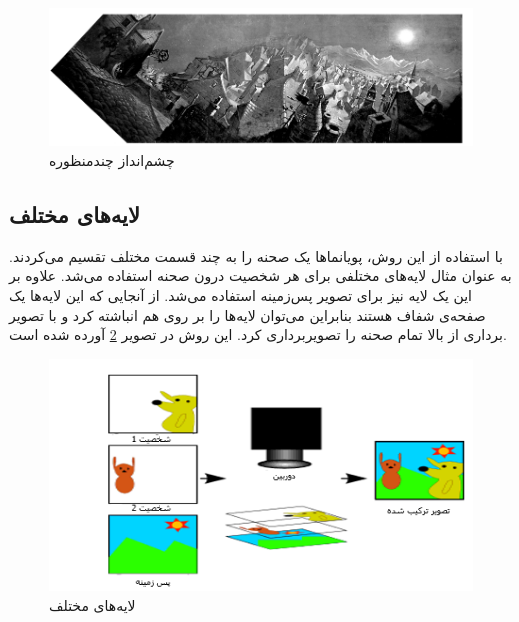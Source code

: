 \begin{figure}[ht]
	\centerline{\includegraphics[width=\textwidth,height=\textheight,keepaspectratio]{Figures/Ch1/Panorama.png}}

	\caption{چشم‌انداز چندمنظوره \cite{Wood1997Multiperspective}}
	\label{fig:Panorama}
\end{figure}


\subsection{لایه‌های مختلف}

با استفاده از این روش، پویانما‌ها یک صحنه را به چند قسمت مختلف تقسیم می‌کردند.
به عنوان مثال لایه‌های مختلفی برای هر شخصیت درون صحنه استفاده می‌شد. علاوه بر این یک لایه نیز برای تصویر پس‌زمینه استفاده می‌شد.
از آنجایی که این لایه‌ها یک صفحه‌ی شفاف هستند بنابراین می‌توان لایه‌‌ها را 
بر روی هم انباشته کرد و با تصویر برداری از بالا تمام صحنه را تصویربرداری کرد.
این روش در تصویر 
\ref{fig:DifferentLayers}
آورده شده است.

\begin{figure}[ht]
	\centerline{\includegraphics[width=\textwidth,height=\textheight,keepaspectratio]{Figures/Ch1/DifferentLayers.png}}

	\caption{لایه‌های مختلف\cite{AnimationCellsWikipedia}}
	\label{fig:DifferentLayers}
\end{figure}

